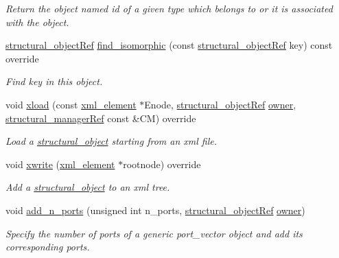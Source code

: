 \begin{DoxyCompactItemize}
\begin{DoxyCompactList}\small\item\em Return the object named id of a given type which belongs to or it is associated with the object. \end{DoxyCompactList}\item 
\hyperlink{structural__objects_8hpp_a8ea5f8cc50ab8f4c31e2751074ff60b2}{structural\+\_\+object\+Ref} \hyperlink{structport__o_a2ece93b5f3aaa09fdadbb373f3f9d31a}{find\+\_\+isomorphic} (const \hyperlink{structural__objects_8hpp_a8ea5f8cc50ab8f4c31e2751074ff60b2}{structural\+\_\+object\+Ref} key) const override
\begin{DoxyCompactList}\small\item\em Find key in this object. \end{DoxyCompactList}\item 
void \hyperlink{structport__o_a9171abd4248f683208298310ce0c0faf}{xload} (const \hyperlink{classxml__element}{xml\+\_\+element} $\ast$Enode, \hyperlink{structural__objects_8hpp_a8ea5f8cc50ab8f4c31e2751074ff60b2}{structural\+\_\+object\+Ref} \hyperlink{classstructural__object_a3e96b3e00b8a78adfc44872d82e186ea}{owner}, \hyperlink{structural__manager_8hpp_ab3136f0e785d8535f8d252a7b53db5b5}{structural\+\_\+manager\+Ref} const \&CM) override
\begin{DoxyCompactList}\small\item\em Load a \hyperlink{classstructural__object}{structural\+\_\+object} starting from an xml file. \end{DoxyCompactList}\item 
void \hyperlink{structport__o_a134c66609a971e40a34dfdea50eb57dd}{xwrite} (\hyperlink{classxml__element}{xml\+\_\+element} $\ast$rootnode) override
\begin{DoxyCompactList}\small\item\em Add a \hyperlink{classstructural__object}{structural\+\_\+object} to an xml tree. \end{DoxyCompactList}\item 
void \hyperlink{structport__o_adf5180258c79071f73582bf9427a8f06}{add\+\_\+n\+\_\+ports} (unsigned int n\+\_\+ports, \hyperlink{structural__objects_8hpp_a8ea5f8cc50ab8f4c31e2751074ff60b2}{structural\+\_\+object\+Ref} \hyperlink{classstructural__object_a3e96b3e00b8a78adfc44872d82e186ea}{owner})
\begin{DoxyCompactList}\small\item\em Specify the number of ports of a generic port\+\_\+vector object and add its corresponding ports. \end{DoxyCompactList}\item 

\end{DoxyCompactItemize}
